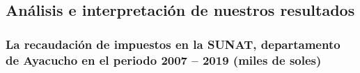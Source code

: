 \documentclass[
  jou,
  floatsintext,
  longtable,
  a4paper,
  nolmodern,
  notxfonts,
  notimes,
  12pt,
  colorlinks=true,linkcolor=blue,citecolor=blue,urlcolor=blue]{apa7}
\begin{document}
\subsection{Análisis e interpretación de nuestros
resultados}\label{anuxe1lisis-e-interpretaciuxf3n-de-nuestros-resultados}

\subsubsection{La recaudación de impuestos en la SUNAT, departamento de
Ayacucho en el periodo 2007 -- 2019 (miles de
soles)}\label{la-recaudaciuxf3n-de-impuestos-en-la-sunat-departamento-de-ayacucho-en-el-periodo-2007-2019-miles-de-soles}

\begin{ThreePartTable}


\end{ThreePartTable}
\end{document}
